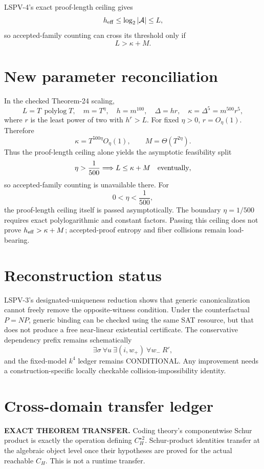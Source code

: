 \documentclass[11pt]{article}
\begin{document}
LSPV-4's exact proof-length ceiling gives
\[
h_{\rm eff}\le\log_2|\mathcal A|\le L,
\]
so accepted-family counting can cross its threshold only if
\[
\boxed{L>\kappa+M.}
\]

\section*{New parameter reconciliation}
In the checked Theorem-24 scaling,
\[
L=T\,\operatorname{polylog}T,\quad
m=T^\eta,\quad
h=m^{100},\quad
\Delta=hr,\quad
\kappa=\Delta^5=m^{500}r^5,
\]
where \(r\) is the least power of two with \(h^r>L\). For fixed \(\eta>0\), \(r=O_\eta(1)\). Therefore
\[
\kappa=T^{500\eta}O_\eta(1),
\qquad
M=\Theta(T^{2\eta}).
\]
Thus the proof-length ceiling alone yields the asymptotic feasibility split
\[
\eta>\frac1{500}\Longrightarrow L\le\kappa+M
\quad\hbox{eventually},
\]
so accepted-family counting is unavailable there. For
\[
0<\eta<\frac1{500},
\]
the proof-length ceiling itself is passed asymptotically. The boundary \(\eta=1/500\) requires exact polylogarithmic and constant factors. Passing this ceiling does not prove \(h_{\rm eff}>\kappa+M\); accepted-proof entropy and fiber collisions remain load-bearing.

\section*{Reconstruction status}
LSPV-3's designated-uniqueness reduction shows that generic canonicalization cannot freely remove the opposite-witness condition. Under the counterfactual \(P=NP\), generic binding can be checked using the same SAT resource, but that does not produce a free near-linear existential certificate. The conservative dependency prefix remains schematically
\[
\exists\sigma\ \forall u\ \exists(i,w_+)\ \forall w_-\ R',
\]
and the fixed-model \(k^4\) ledger remains CONDITIONAL. Any improvement needs a construction-specific locally checkable collision-impossibility identity.

\section*{Cross-domain transfer ledger}
\textbf{EXACT THEOREM TRANSFER.}
Coding theory's componentwise Schur product is exactly the operation defining \(C_H^{\star2}\). Schur-product identities transfer at the algebraic object level once their hypotheses are proved for the actual reachable \(C_H\). This is not a runtime transfer.
\end{document}

